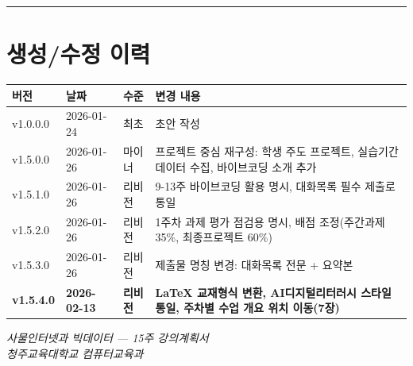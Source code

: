 \documentclass[11pt, a4paper]{article}
\begin{document}
\vspace{3pt}
\noindent\rule{\textwidth}{0.3pt}

\section*{생성/수정 이력}

\begin{table}[H]
\centering
\small
\begin{tabular}{|L{1.8cm}|L{2cm}|L{1.5cm}|L{8cm}|}
\hline
{}
\textbf{버전} & \textbf{날짜} & \textbf{수준} & \textbf{변경 내용} \\
\hline
v1.0.0.0 & 2026-01-24 & 최초 & 초안 작성 \\
\hline
v1.5.0.0 & 2026-01-26 & 마이너 & 프로젝트 중심 재구성: 학생 주도 프로젝트, 실습기간 데이터 수집, 바이브코딩 소개 추가 \\
\hline
v1.5.1.0 & 2026-01-26 & 리비전 & 9-13주 바이브코딩 활용 명시, 대화목록 필수 제출로 통일 \\
\hline
v1.5.2.0 & 2026-01-26 & 리비전 & 1주차 과제 평가 점검용 명시, 배점 조정(주간과제 35\%, 최종프로젝트 60\%) \\
\hline
v1.5.3.0 & 2026-01-26 & 리비전 & 제출물 명칭 변경: 대화목록 전문 + 요약본 \\
\hline
\textbf{v1.5.4.0} & \textbf{2026-02-13} & \textbf{리비전} & \textbf{LaTeX 교재형식 변환, AI디지털리터러시 스타일 통일, 주차별 수업 개요 위치 이동(7장)} \\
\hline
\end{tabular}
\end{table}

\vspace{15pt}
\begin{center}
\textit{사물인터넷과 빅데이터 — 15주 강의계획서}\\[3pt]
\textit{청주교육대학교 컴퓨터교육과}
\end{center}
\end{document}
